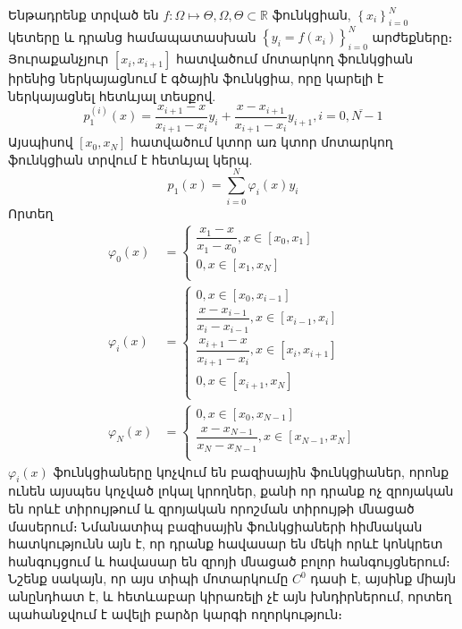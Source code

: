 \documentclass[fleqn, bachelor,subf,12pt,notitlepage]{article}
\begin{document}
Ենթադրենք տրված են $f:\Omega \mapsto \Theta, \Omega, \Theta \subset \mathbb{R}$ ֆունկցիան,  $\left\{x_{i}\right\}_{i=0}^{N}$ կետերը և դրանց համապատասխան $\left\{y_{i}=f\left(x_{i}\right)\right\}_{i=0}^{N}$ արժեքները։ Յուրաքանչյուր $\left[x_{i}, x_{i+1}\right]$ հատվածում  մոտարկող ֆունկցիան իրենից ներկայացնում է գծային ֆունկցիա, որը կարելի է ներկայացնել հետևյալ տեսքով.
\begin{equation}
p_{1}^{(i)}\left(x\right)=\dfrac{x_{i+1}-x}{x_{i+1}-x_{i}}y_{i}+\dfrac{x-x_{i+1}}{x_{i+1}-x_{i}}y_{i+1}, i=\overline{0, N-1}
\end{equation}
Այսպիսով $\left[x_{0}, x_{N}\right]$ հատվածում կտոր առ կտոր մոտարկող ֆունկցիան տրվում է հետևյալ կերպ.
\begin{equation}
p_{1}\left(x\right)=\sum_{i=0}^{N}\varphi_{i} \left(x\right)y_{i}
\end{equation}
Որտեղ 
\begin{equation}
\begin{aligned}
\varphi_{0}\left(x\right)&=\begin{cases}
\dfrac{x_{1}-x}{x_{1}-x_{0}}, x\in \left[x_{0}, x_{1}\right]\\
0, x\in \left[x_{1}, x_{N}\right]\\
\end{cases}\\
\varphi_{i}\left(x\right)&=\begin{cases}
0, x\in \left[x_{0}, x_{i-1}\right]\\
\dfrac{x-x_{i-1}}{x_{i}-x_{i-1}}, x\in \left[x_{i-1}, x_{i}\right]\\
\dfrac{x_{i+1}-x}{x_{i+1}-x_{i}}, x\in \left[x_{i}, x_{i+1}\right]\\
0, x\in \left[x_{i+1}, x_{N}\right]\\
\end{cases}\\
\varphi_{N}\left(x\right)&=\begin{cases}
0, x\in \left[x_{0}, x_{N-1}\right]\\
\dfrac{x-x_{N-1}}{x_{N}-x_{N-1}}, x\in \left[x_{N-1}, x_{N}\right]\\
\end{cases}
\end{aligned}
\end{equation}
$\varphi_{i}\left(x\right)$ ֆունկցիաները կոչվում են բազիսային ֆունկցիաներ, որոնք ունեն այսպես կոչված լոկալ կրողներ, քանի որ դրանք ոչ զրոյական են որևէ տիրույթում և զրոյական որոշման տիրույթի մնացած մասերում։
Նմանատիպ բազիսային ֆունկցիաների հիմնական հատկությունն այն է, որ դրանք հավասար են մեկի որևէ կոնկրետ հանգույցում և հավասար են զրոյի մնացած բոլոր հանգույցներում։ Նշենք սակայն, որ այս տիպի մոտարկումը $C^{0}$ դասի է, այսինք միայն անընդհատ է, և հետևաբար կիրառելի չէ այն խնդիրներում, որտեղ պահանջվում է ավելի բարձր կարգի ողորկություն։
\end{document}
